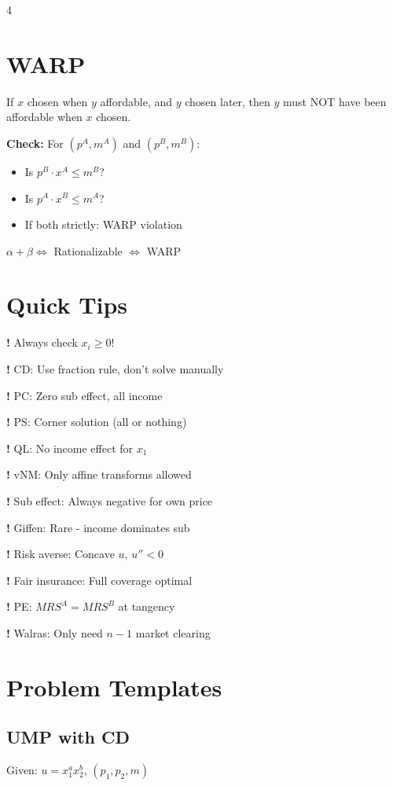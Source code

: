 \documentclass[8pt,landscape]{article}
\newcommand{\tip}[1]{\textcolor{red!70!black}{\textbf{!} #1}}
\begin{document}
\begin{multicols}{4}
\section{WARP}

If $x$ chosen when $y$ affordable, and $y$ chosen later, then $y$ must NOT have been affordable when $x$ chosen.

\textbf{Check:} For $(p^A, m^A)$ and $(p^B, m^B)$:
\begin{itemize}
    \item Is $p^B \cdot x^A \leq m^B$?
    \item Is $p^A \cdot x^B \leq m^A$?
    \item If both strictly: WARP violation
\end{itemize}

$\alpha + \beta \Leftrightarrow$ Rationalizable $\Leftrightarrow$ WARP

\section{Quick Tips}

\tip{Always check $x_i \geq 0$!}

\tip{CD:} Use fraction rule, don't solve manually

\tip{PC:} Zero sub effect, all income

\tip{PS:} Corner solution (all or nothing)

\tip{QL:} No income effect for $x_1$

\tip{vNM:} Only affine transforms allowed

\tip{Sub effect:} Always negative for own price

\tip{Giffen:} Rare - income dominates sub

\tip{Risk averse:} Concave $u$, $u'' < 0$

\tip{Fair insurance:} Full coverage optimal

\tip{PE:} $MRS^A = MRS^B$ at tangency

\tip{Walras:} Only need $n-1$ market clearing

\columnbreak

\section{Problem Templates}

\subsection{UMP with CD}
Given: $u = x_1^a x_2^b$, $(p_1, p_2, m)$


\end{multicols}
\end{document}
